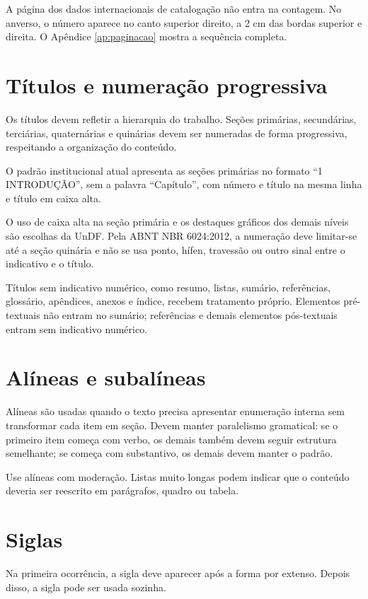 A página dos dados internacionais de catalogação não entra na contagem. No anverso, o número aparece no canto superior direito, a 2 cm das bordas superior e direita. O Apêndice \ref{ap:paginacao} mostra a sequência completa.

\section{Títulos e numeração progressiva}

Os títulos devem refletir a hierarquia do trabalho. Seções primárias, secundárias, terciárias, quaternárias e quinárias devem ser numeradas de forma progressiva, respeitando a organização do conteúdo.

O padrão institucional atual apresenta as seções primárias no formato ``1 INTRODUÇÃO'', sem a palavra ``Capítulo'', com número e título na mesma linha e título em caixa alta.

\decisaoinstitucional

O uso de caixa alta na seção primária e os destaques gráficos dos demais níveis são escolhas da UnDF. Pela ABNT NBR 6024:2012, a numeração deve limitar-se até a seção quinária e não se usa ponto, hífen, travessão ou outro sinal entre o indicativo e o título.

Títulos sem indicativo numérico, como resumo, listas, sumário, referências, glossário, apêndices, anexos e índice, recebem tratamento próprio. Elementos pré-textuais não entram no sumário; referências e demais elementos pós-textuais entram sem indicativo numérico.

\section{Alíneas e subalíneas}

Alíneas são usadas quando o texto precisa apresentar enumeração interna sem transformar cada item em seção. Devem manter paralelismo gramatical: se o primeiro item começa com verbo, os demais também devem seguir estrutura semelhante; se começa com substantivo, os demais devem manter o padrão.

Use alíneas com moderação. Listas muito longas podem indicar que o conteúdo deveria ser reescrito em parágrafos, quadro ou tabela.

\section{Siglas}

Na primeira ocorrência, a sigla deve aparecer após a forma por extenso. Depois disso, a sigla pode ser usada sozinha.

